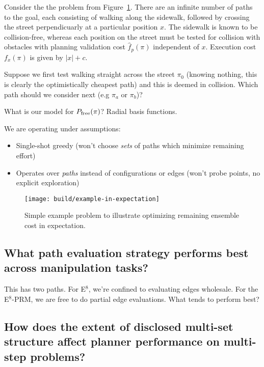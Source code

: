{Consider the the problem from Figure~\ref{fig:example-in-expectation}.
There are an infinite number of paths to the goal,
each consisting of walking along the sidewalk,
followed by crossing the street perpendicuarly at a particular
position $x$.
The sidewalk is known to be collision-free,
whereas each position on the street must be tested for collision
with obstacles with planning validation cost $\hat{f}_p(\pi)$
independent of $x$.
Execution cost $f_x(\pi)$ is given by $|x|+c$.

Suppose we first test walking straight across the street $\pi_0$
(knowing nothing, this is clearly the optimistically cheapest path)
and this is deemed in collision.
Which path should we consider next (e.g $\pi_a$ or $\pi_b$)?

What is our model for $P_{\mbox{\scriptsize free}}(\pi)$?
Radial basis functions.

We are operating under assumptions:
\begin{itemize}
\item Single-shot greedy (won't choose \emph{sets} of paths
   which minimize remaining effort)
\item Operates over \emph{paths} instead of configurations
   or edges (won't probe points, no explicit exploration)
\end{itemize}

\begin{figure}
   \begin{center}
   \texttt{[image: build/example-in-expectation]}
   \end{center}
   \caption{Simple example problem to illustrate optimizing
      remaining ensemble cost in expectation.}
   \label{fig:example-in-expectation}
\end{figure}

\subsection{What path evaluation strategy performs best
   across manipulation tasks?}
\label{ques:evalpath}

This has two paths.
For E$^8$,
we're confined to evaluating edges wholesale.
For the E$^8$-PRM,
we are free to do partial edge evaluations.
What tends to perform best?

\subsection{How does the extent of disclosed multi-set structure
   affect planner performance on multi-step problems?}
\label{ques:multi-set-suited}

}
